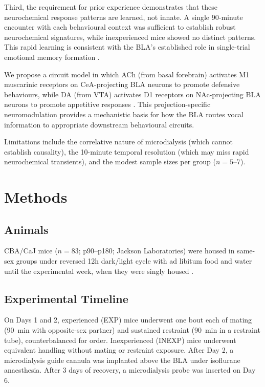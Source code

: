 \documentclass[11pt]{article}
\begin{document}
Third, the requirement for prior experience demonstrates that these neurochemical response patterns are learned, not innate. A single 90-minute encounter with each behavioural context was sufficient to establish robust neurochemical signatures, while inexperienced mice showed no distinct patterns. This rapid learning is consistent with the BLA's established role in single-trial emotional memory formation \citep{mcgaugh2004amygdala, bocchio2017synaptic}.

We propose a circuit model in which ACh (from basal forebrain) activates M1 muscarinic receptors on CeA-projecting BLA neurons to promote defensive behaviours, while DA (from VTA) activates D1 receptors on NAc-projecting BLA neurons to promote appetitive responses \citep{namburi2015circuit, beyeler2018organization, stuber2011excitatory}. This projection-specific neuromodulation provides a mechanistic basis for how the BLA routes vocal information to appropriate downstream behavioural circuits.

Limitations include the correlative nature of microdialysis (which cannot establish causality), the 10-minute temporal resolution (which may miss rapid neurochemical transients), and the modest sample sizes per group ($n = 5$--7).

\section{Methods}

\subsection{Animals}
CBA/CaJ mice ($n = 83$; p90--p180; Jackson Laboratories) were housed in same-sex groups under reversed 12h dark/light cycle with ad libitum food and water until the experimental week, when they were singly housed \citep{willott1991acoustic}.

\subsection{Experimental Timeline}
On Days 1 and 2, experienced (EXP) mice underwent one bout each of mating (90~min with opposite-sex partner) and sustained restraint (90~min in a restraint tube), counterbalanced for order. Inexperienced (INEXP) mice underwent equivalent handling without mating or restraint exposure. After Day 2, a microdialysis guide cannula was implanted above the BLA under isoflurane anaesthesia. After 3 days of recovery, a microdialysis probe was inserted on Day 6.
\end{document}
